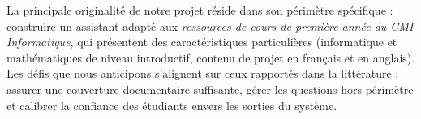 \documentclass[a4paper,11pt]{article}
\begin{document}
La principale originalité de notre projet réside dans son périmètre
spécifique : construire un assistant adapté aux \emph{ressources de cours
de première année du CMI Informatique}, qui présentent des caractéristiques
particulières (informatique et mathématiques de niveau introductif, contenu
de projet en français et en anglais). Les défis que nous anticipons
s'alignent sur ceux rapportés dans la littérature : assurer une couverture
documentaire suffisante, gérer les questions hors périmètre et calibrer
la confiance des étudiants envers les sorties du système.

\newpage


\end{document}

